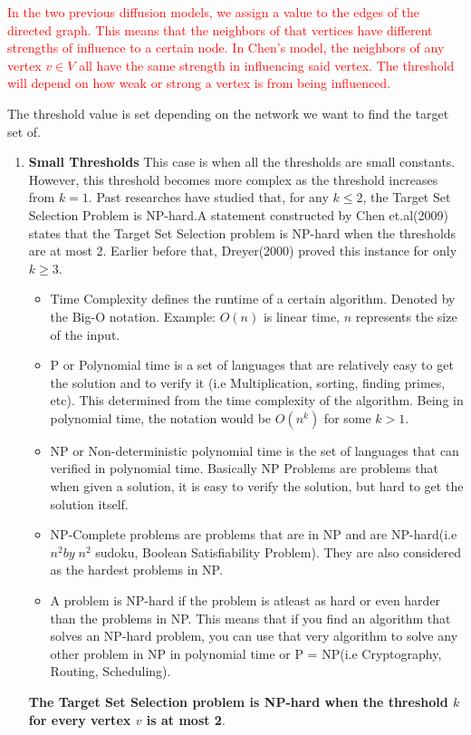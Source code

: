 \textcolor{red}{In the two previous diffusion models, we assign a value to the edges of the directed graph. This means that the neighbors of that vertices have different strengths of influence to a certain node. In Chen's model, the neighbors of any vertex $v \in V$ all have the same strength in influencing said vertex. The threshold will depend on how weak or strong a vertex is from being influenced.}

The threshold value is set depending on the network we want to find the target set of.

\begin{enumerate}
	\item \textbf{Small Thresholds} This case is when all the thresholds are small constants. However, this threshold becomes more complex as the threshold increases from $k=1$. Past researches have studied that, for any $k \leq 2$, the Target Set Selection Problem is NP-hard.A statement constructed by Chen et.al(2009) states that the Target Set Selection problem is NP-hard when the thresholds are at most 2. Earlier before that, Dreyer(2000) proved this instance for only $k \geq 3$.\cite{dreyer} \cite{NPhardness} 
	\begin{itemize}
	\item Time Complexity defines the runtime of a certain algorithm. Denoted by the Big-O notation. Example: $O(n)$ is linear time, $n$ represents the size of the input.
	\item P or Polynomial time is a set of languages that are relatively easy to get the solution and to verify it (i.e Multiplication, sorting, finding primes, etc). This determined from the time complexity of the algorithm. Being in polynomial time, the notation would be $O(n^k)$ for some $k>1$.
	\item NP or Non-deterministic polynomial time is the set of languages that can verified in polynomial time. Basically NP Problems are problems that when given a solution, it is easy to verify the solution, but hard to get the solution itself.
	\item NP-Complete problems are problems that are in NP and are NP-hard(i.e $n^{2}by\; n^{2}$ sudoku, Boolean Satisfiability Problem). They are also considered as the hardest problems in NP.
	\item A problem is NP-hard if the problem is atleast as hard or even harder than the problems in NP. This means that if you find an algorithm that solves an NP-hard problem, you can use that very algorithm to solve any other problem in NP in polynomial time or P = NP(i.e Cryptography, Routing, Scheduling).  
\end{itemize} 
\textbf{The Target Set Selection problem is NP-hard when the threshold $k$ for every vertex $v$ is at most 2}. \cite{chen,dreyer}


\end{enumerate}
